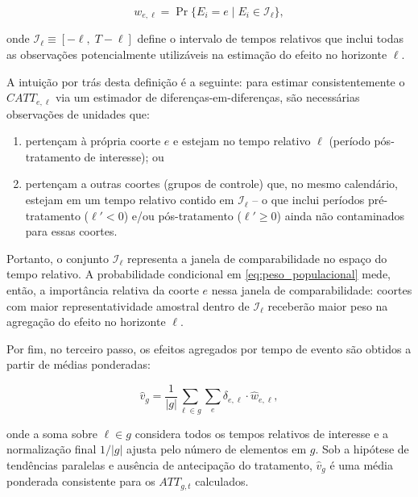 \documentclass[12pt,a4paper,oneside]{article}
\begin{document}
\begin{equation}
	w_{e,\ell} = \Pr\{E_i = e \mid E_i \in \mathcal{I}_\ell\},
	\label{eq:peso_populacional}
\end{equation}

onde $\mathcal{I}_\ell \equiv [-\ell,\; T-\ell]$ define o intervalo de tempos relativos que inclui todas as observações potencialmente utilizáveis na estimação do efeito no horizonte $\ell$. 

A intuição por trás desta definição é a seguinte: para estimar consistentemente o $CATT_{e,\ell}$ via um estimador de diferenças-em-diferenças, são necessárias observações de unidades que:
\begin{enumerate}
	\item pertençam à própria coorte $e$ e estejam no tempo relativo $\ell$ (período pós-tratamento de interesse); ou
	\item pertençam a outras coortes (grupos de controle) que, no mesmo calendário, estejam em um tempo relativo contido em $\mathcal{I}_\ell$ -- o que inclui períodos pré-tratamento ($\ell'<0$) e/ou pós-tratamento ($\ell' \ge 0$) ainda não contaminados para essas coortes.
\end{enumerate}

Portanto, o conjunto $\mathcal{I}_\ell$ representa a janela de comparabilidade no espaço do tempo relativo. A probabilidade condicional em \eqref{eq:peso_populacional} mede, então, a importância relativa da coorte $e$ nessa janela de comparabilidade: coortes com maior representatividade amostral dentro de $\mathcal{I}_\ell$ receberão maior peso na agregação do efeito no horizonte $\ell$.

	Por fim, no terceiro passo, os efeitos agregados por tempo de evento são obtidos a partir de médias ponderadas:
		
		\begin{equation}
			\hat{v}_g = \frac{1}{|g|} \sum_{\ell \in g} \sum_e \delta_{e,\ell} \cdot \hat{w}_{e,\ell},
		\end{equation}
		
		onde a soma sobre $\ell \in g$ considera todos os tempos relativos de interesse e a normalização final $1/|g|$ ajusta pelo número de elementos em $g$. Sob a hipótese de tendências paralelas e ausência de antecipação do tratamento, $\hat{v}_g$ é uma média ponderada consistente para os $ATT_{g,t}$ calculados.
		
\end{document}
